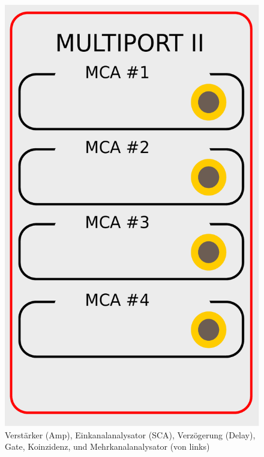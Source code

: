 \begin{figure}[ht]
  \includegraphics[height=0.25\textheight]{BilderAufbau/mca.pdf}
 \caption{Verstärker (Amp), Einkanalanalysator (SCA), Verzögerung (Delay), Gate, Koinzidenz, und Mehrkanalanalysator (von links)}
 \label{geraete}
\end{figure}



